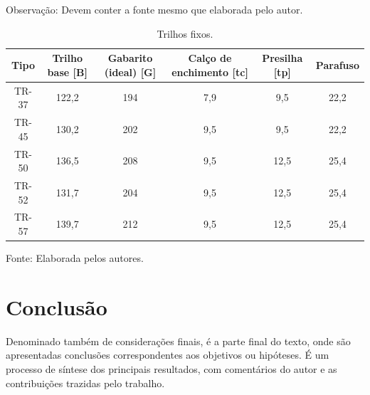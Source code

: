 \documentclass[
  12pt,		%
  a4paper,	%
  openright,  %
  oneside,	%
  chapter=TITLE,		%
  section=TITLE,		%
  english,	%
  french,	    %
  spanish,	%
  brazil	    %
]{abntex2}
\begin{document}
                Observação: Devem conter a fonte mesmo que elaborada pelo autor.
                
                \begin{table}[H]
                    \centering
                    \caption{Trilhos fixos.}
                    \begin{tabular}{c|c|c|c|c|c}
                    \hline
                    Tipo & Trilho base [B] & Gabarito (ideal) [G] & Calço de enchimento [tc] & Presilha [tp] & Parafuso \\
                    \hline 
                    TR-37 & 122,2 & 194 & 7,9 & 9,5 & 22,2 \\
                    TR-45 & 130,2 & 202 & 9,5 & 9,5 & 22,2 \\
                    TR-50 & 136,5 & 208 & 9,5 & 12,5 & 25,4 \\
                    TR-52 & 131,7 & 204 & 9,5 & 12,5 & 25,4 \\
                    TR-57 & 139,7 & 212 & 9,5 & 12,5 & 25,4 \\
                    \hline
                    \end{tabular}
                    {\small Fonte: Elaborada pelos autores.}
                    \label{tab:ex}
                \end{table}

    \chapter{Conclusão}
                  
        Denominado também de considerações finais, é a parte final do texto, onde são apresentadas conclusões correspondentes aos objetivos ou hipóteses. É um processo de síntese dos principais resultados, com comentários do autor e as contribuições trazidas pelo trabalho. 
   
    
    \postextual
    
\end{document}
